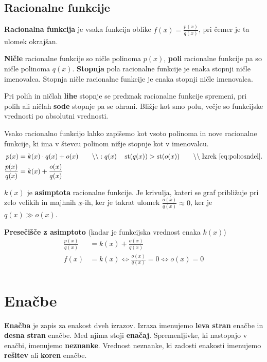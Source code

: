 \documentclass[a4paper,oneside,12pt,fleqn]{article}
\newcommand\krat\cdot
\newcommand{\comment}[1]{\ensuremath{\qquad\backslash\backslash\;}\textnormal{#1}}
\newcommand{\st}{\ensuremath{\operatorname{st}}} %
\renewcommand\iff\Leftrightarrow
\numberwithin{equation}{section}
\begin{document}
\subsection{Racionalne funkcije}
\label{sec:fun:rac}
\textbf{Racionalna funkcija} je vsaka funkcija oblike $f(x) = \frac{p(x)}{q(x)}$, pri čemer je ta
ulomek okrajšan.

\textbf{Ničle} racionalne funkcije so ničle polinoma $p(x)$, \textbf{poli} racionalne funkcije pa so ničle
polinoma $q(x)$. \textbf{Stopnja} pola racionalne funkcije je enaka stopnji ničle
imenovalca. Stopnja ničle racionalne funkcije je enaka stopnji ničle imenovalca.

Pri polih in ničlah \textbf{lihe} stopnje se predznak racionalne funkcije spremeni, pri polih ali
ničlah \textbf{sode} stopnje pa se ohrani. Bližje kot smo polu, večje so funkcijske
vrednosti po absolutni vrednosti.

Vsako racionalno funkcijo lahko zapišemo kot vsoto polinoma in nove racionalne funkcije,
ki ima v števcu polinom nižje stopnje kot v imenovalcu.
\begin{align*}
  p(x) &= k(x) \krat q(x) + o(x) \comment{$:q(x)$}  \quad \st(q(x)) > \st(o(x))
  \comment{Izrek~\eqref{eq:pol:osndel}.} \\
    \frac{p(x)}{q(x)} &= k(x) + \frac{o(x)}{q(x)} 
\end{align*}

$k(x)$ je \textbf{asimptota} racionalne funkcije. Je krivulja, kateri se graf približuje pri zelo
velikih in majhnih $x$-ih, ker je takrat ulomek $\frac{o(x)}{q(x)} \approx 0$, ker je $q(x)
\gg o(x)$.

\textbf{Presečišče z asimptoto} (kadar je funkcijska vrednost enaka $k(x)$)
\begin{align*}
    \frac{p(x)}{q(x)} &= k(x) + \frac{o(x)}{q(x)} \\
    f(x) &= k(x) \iff \frac{o(x)}{q(x)} = 0 \iff o(x) = 0 \\
\end{align*}

\section{Enačbe}
\label{sec:enac}
\textbf{Enačba} je zapis za enakost dveh izrazov. Izraza imenujemo \textbf{leva stran}
enačbe in \textbf{desna stran}
enačbe. Med njima stoji \textbf{enačaj}. Spremenljivke, ki nastopajo v enačbi, imenujemo
\textbf{neznanke}.
Vrednost neznanke, ki zadosti enakosti imenujemo \textbf{rešitev} ali \textbf{koren} enačbe.
\end{document}
